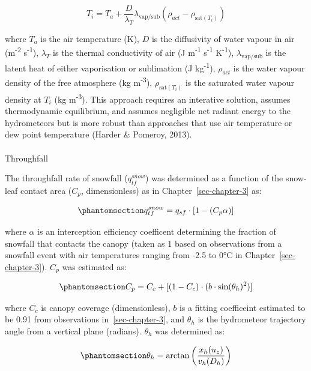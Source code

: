 \documentclass[
  letterpaper,
]{tex/uofsthesis-cs}
\makeatletter
\let\oldparagraph\paragraph
\renewcommand{\paragraph}{
    \@ifstar
      \xxxParagraphStar
      \xxxParagraphNoStar
  }
\newcommand{\xxxParagraphStar}[1]{\oldparagraph*{#1}\mbox{}}
\newcommand{\xxxParagraphNoStar}[1]{\oldparagraph{#1}\mbox{}}
\makeatother
\begin{document}
\[
T_i = T_a + \frac{D}{\lambda_T}\lambda_{\text{vap/sub}}\left(\rho_{act} - \rho_{\text{sat}(T_i)}\right)
\]

where \(T_a\) is the air temperature (K), \(D\) is the diffusivity of
water vapour in air (m\textsuperscript{-2} s\textsuperscript{-1}),
\(\lambda_T\) is the thermal conductivity of air (J
m\textsuperscript{-1} s\textsuperscript{-1} K\textsuperscript{-1}),
\(\lambda_\text{vap/sub}\) is the latent heat of either vaporisation or
sublimation (J kg\textsuperscript{-1}), \(\rho_{act}\) is the water
vapour density of the free atmosphere (kg m\textsuperscript{-3}),
\(\rho_{\text{sat}(T_i)}\) is the saturated water vapour density at
\(T_i\) (kg m\textsuperscript{-3}). This approach requires an interative
solution, assumes thermodynamic equilibrium, and assumes negligible net
radiant energy to the hydrometeors but is more robust than approaches
that use air temperature or dew point temperature (Harder \& Pomeroy,
2013).

\paragraph{Throughfall}\label{throughfall}

The throughfall rate of snowfall (\(q_{tf}^{snow}\)) was determined as a
function of the snow-leaf contact area (\(C_p\), dimensionless) as in
Chapter~\ref{sec-chapter-3} as:

\begin{equation}\phantomsection\label{eq-tf-snow}{
q_{tf}^{snow} = q_{sf} \cdot [1 - (C_p \alpha)]
}\end{equation}

where \(\alpha\) is an interception efficiency coefficent determining
the fraction of snowfall that contacts the canopy (taken as 1 based on
observations from a snowfall event with air temperatures ranging from
-2.5 to 0°C in Chapter~\ref{sec-chapter-3}). \(C_p\) was estimated as:

\begin{equation}\phantomsection\label{eq-cp-05}{
C_p = C_c + [(1-C_c) \cdot (b \cdot \text{sin}(\theta_h)^2)]
}\end{equation}

where \(C_c\) is canopy coverage (dimensionless), \(b\) is a fitting
coefficeint estimated to be 0.91 from observations
in~\ref{sec-chapter-3}, and \(\theta_h\) is the hydrometeor trajectory
angle from a vertical plane (radians). \(\theta_h\) was determined as:

\begin{equation}\phantomsection\label{eq-ta-05}{
\theta_h = \arctan \left(\frac{x_h(u_z)}{v_h(D_h)}\right)
}\end{equation}
\end{document}
